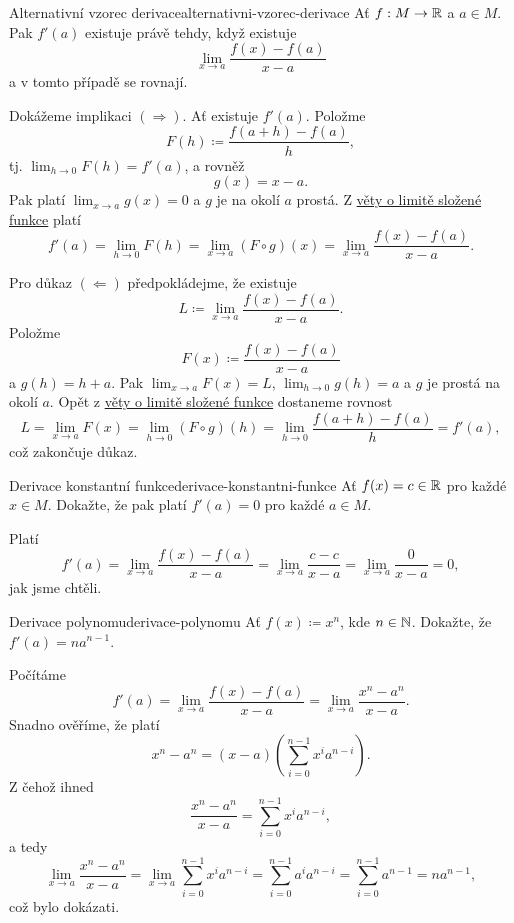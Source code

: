 \begin{lemma}{Alternativní vzorec derivace}{alternativni-vzorec-derivace}
 Ať $f:M \to \mathbb{R}$ a $a \in M$. Pak $f'(a)$ existuje právě tehdy, když existuje
 \[
  \lim_{x \to a} \frac{f(x) - f(a)}{x - a}
 \]
 a v tomto případě se rovnají.
\end{lemma}
\begin{lemproof}
 Dokážeme implikaci $( \Rightarrow )$. Ať existuje $f'(a)$. Položme
 \[
  F(h) \coloneqq \frac{f(a + h) - f(a)}{h},
 \]
 tj. $\lim_{h \to 0} F(h) = f'(a)$, a rovněž
 \[
  g(x) = x - a.
 \]
 Pak platí $\lim_{x \to a} g(x) = 0$ a $g$ je na okolí $a$ prostá. Z
 \hyperref[thm:limita-slozene-funkce]{věty o limitě složené funkce} platí
 \[
  f'(a) = \lim_{h \to 0} F(h) = \lim_{x \to a} (F \circ g)(x) = \lim_{x \to a}
  \frac{f(x) - f(a)}{x - a}.
 \]

 Pro důkaz $( \Leftarrow )$ předpokládejme, že existuje
 \[
  L \coloneqq \lim_{x \to a} \frac{f(x) - f(a)}{x - a}.
 \]
 Položme
 \[
  F(x) \coloneqq \frac{f(x) - f(a)}{x - a}
 \]
 a $g(h) = h + a$. Pak $\lim_{x \to a} F(x) = L$, $\lim_{h \to 0} g(h) = a$ a
 $g$ je prostá na okolí $a$. Opět z \hyperref[thm:limita-slozene-funkce]{věty o
 limitě složené funkce} dostaneme rovnost
 \[
  L = \lim_{x \to a} F(x) = \lim_{h \to 0} (F \circ g)(h) = \lim_{h \to 0}
  \frac{f(a + h) - f(a)}{h} = f'(a),
 \]
 což zakončuje důkaz.
\end{lemproof}

\begin{problem}{Derivace konstantní funkce}{derivace-konstantni-funkce}
 Ať $f(x) = c \in \mathbb{R}$ pro každé $x \in M$. Dokažte, že pak platí $f'(a) = 0$ pro
 každé $a \in M$.
\end{problem}
\begin{probsol}
 Platí
 \[
  f'(a) = \lim_{x \to a} \frac{f(x) - f(a)}{x - a} = \lim_{x \to a} \frac{c -
  c}{x - a} = \lim_{x \to a} \frac{0}{x-a} = 0,
 \]
 jak jsme chtěli.
\end{probsol}

\begin{problem}{Derivace polynomu}{derivace-polynomu}
 Ať $f(x) \coloneqq x^{n}$, kde $n \in \mathbb{N}$. Dokažte, že $f'(a) = na^{n-1}$.
\end{problem}
\begin{probsol}
 Počítáme
 \[
  f'(a) = \lim_{x \to a} \frac{f(x) - f(a)}{x - a} = \lim_{x \to a} \frac{x^{n}
  - a^{n}}{x - a}.
 \]
 Snadno ověříme, že platí
 \[
  x^{n} - a^{n} = (x - a)\left( \sum_{i=0}^{n-1} x^{i}a^{n-i} \right).
 \]
 Z čehož ihned
 \[
  \frac{x^{n} - a^{n}}{x - a} = \sum_{i=0}^{n-1} x^{i}a^{n-i},
 \]
 a tedy
 \[
  \lim_{x \to a} \frac{x^{n} - a^{n}}{x-a} = \lim_{x \to a} \sum_{i=0}^{n-1}
  x^{i}a^{n-i} = \sum_{i=0}^{n-1} a^{i}a^{n-i} = \sum_{i=0}^{n-1} a^{n-1} =
  na^{n-1},
 \]
 což bylo dokázati.
\end{probsol}

